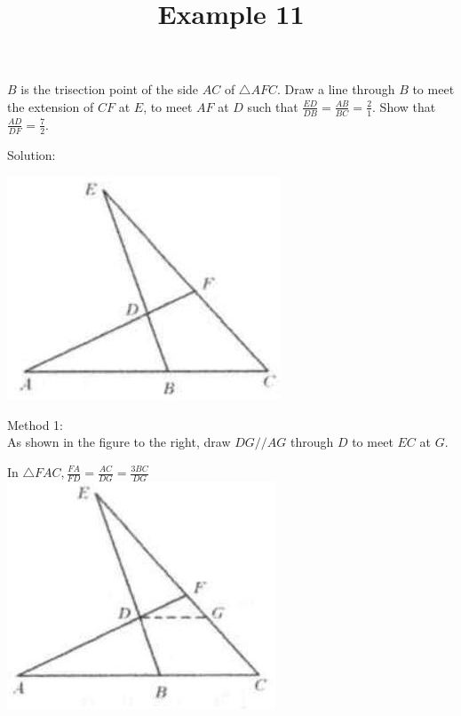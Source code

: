 \documentclass{article}
\title{Example 11}
\date{}
\begin{document}
\maketitle

\(B\) is the trisection point of the side \(A C\) of \(\triangle A F C\). Draw a line through \(B\) to meet the extension of \(C F\) at \(E\), to meet \(A F\) at \(D\) such that \(\frac{E D}{D B}=\frac{A B}{B C}=\frac{2}{1}\). Show that \(\frac{A D}{D F}=\frac{7}{2}\).

Solution:
\begin{center}
\includegraphics[width=\textwidth]{images/111(3).jpg}
\end{center}

Method 1:\\
As shown in the figure to the right, draw \(D G / / A G\) through \(D\) to meet \(E C\) at \(G\).

In \(\triangle F A C, \frac{F A}{F D}=\frac{A C}{D G}=\frac{3 B C}{D G}\)\\
\centering
\includegraphics[width=\textwidth]{images/111(2).jpg}
\end{document}
